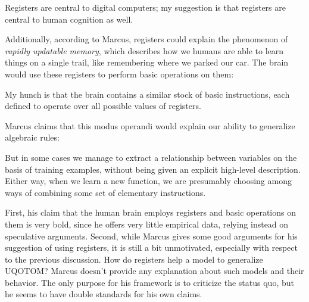 \documentclass[../../main.tex]{subfiles}
\begin{document}
\begin{citecallout}
    Registers are central to digital computers; my suggestion is that registers are central to human cognition as well.
\end{citecallout}

Additionally, according to Marcus, registers could explain the phenomenon of \emph{rapidly updatable memory}, which describes how we humans are able to learn things on a single trail, like remembering where we parked our car. The brain would use these registers to perform basic operations on them:

\begin{citecallout}
    My hunch
    is that the brain contains a similar stock of basic instructions, each defined to operate over all possible values of registers.
\end{citecallout}

Marcus claims that this modus operandi would explain our ability to generalize algebraic rules:

\begin{citecallout}
    But in some cases we manage to extract a relationship between
    variables on the basis of training examples, without being given an explicit high-level description. Either way, when we learn a new function,
    we are presumably choosing among ways of combining some set of
    elementary instructions.
\end{citecallout}

\begin{critique}
    First, his claim that the human brain employs registers and basic operations on them is very bold, since he offers very little empirical data, relying instead on speculative arguments.
    Second, while Marcus gives some good arguments for his suggestion of using registers, it is still a bit unmotivated, especially with respect to the previous discussion. How do registers help a model to generalize UQOTOM? Marcus doesn't provide any explanation about such models and their behavior. The only purpose for his framework is to criticize the status quo, but he seems to have double standards for his own claims.
\end{critique}

\end{document}
